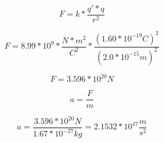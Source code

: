 \documentclass[11pt]{article}
\begin{document}
	\begin{equation}
		F = k * \frac{q'*q}{r^2}
	\end{equation}
	
	\begin{equation}
		F = 8.99 * 10^9*\frac{N*m^2}{C^2}*\frac{(1.60*10^{-19}C)^2}{(2.0*10^{-15}m)^2}
	\end{equation}
	
	\begin{equation}
		F = 3.596 * 10^{20}N
	\end{equation}
	
	\begin{equation}
		a = \frac{F}{m}
	\end{equation}
	
	\begin{equation}
		a = \frac{3.596*10^{20}N}{1.67*10^{-27}kg} = 2.1532 * 10^{47} \frac{m}{s^2}
	\end{equation}
\end{document}
